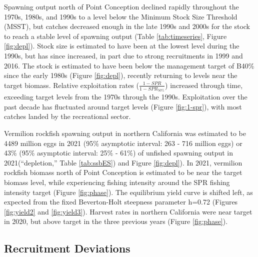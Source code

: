 \documentclass[11pt,
  english,
]{article}
\begin{document}
Spawning output north of Point Conception declined rapidly throughout the 1970s, 1980s, and 1990s to a level below the Minimum Stock Size Threshold (MSST), but catches decreased enough in the late 1990s and 2000s for the stock to reach a stable level of spawning output (Table \ref{tab:timeseries}, Figure \ref{fig:depl}). Stock size is estimated to have been at the lowest level during the 1990s, but has since increased, in part due to strong recruitments in 1999 and 2016. The stock is estimated to have been below the management target of B40\% since the early 1980s (Figure \ref{fig:depl}), recently returning to levels near the target biomass. Relative exploitation rates ({\(\frac{1-SPR}{1-SPR_{50\%}}\)\leavevmode\tagmcend\tagstructend}) increased through time, exceeding target levels from the 1970s through the 1990s. Exploitation over the past decade has fluctuated around target levels (Figure \ref{fig:1-spr}), with most catches landed by the recreational sector.

Vermilion rockfish spawning output in northern California was estimated to be 4489 million eggs in 2021 (95\% asymptotic interval: 263 - 716 million eggs) or 43\% (95\% asymptotic interval: 25\% - 61\%) of unfished spawning output in 2021(``depletion,'' Table \ref{tab:ssbES}) and Figure \ref{fig:depl}). In 2021, vermilion rockfish biomass north of Point Conception is estimated to be near the target biomass level, while experiencing fishing intensity around the SPR fishing intensity target (Figure \ref{fig:phase}). The equilibrium yield curve is shifted left, as expected from the fixed Beverton-Holt steepness parameter h=0.72 (Figures \ref{fig:yield2} and \ref{fig:yield3}). Harvest rates in northern California were near target in 2020, but above target in the three previous years (Figure \ref{fig:phase}).


\hypertarget{recruitment-deviations}{%
\subsection{Recruitment Deviations}\label{recruitment-deviations}}

\leavevmode\tagmcend\tagstructend
\end{document}
